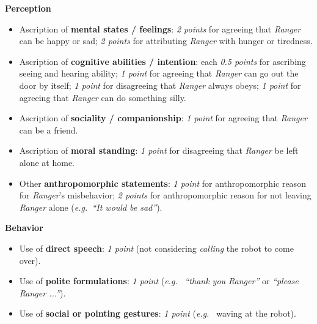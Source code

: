 \documentclass[letterpaper, 10pt, conference]{ieeeconf}
\newcommand{\eg}{{\textit{e.g.~}}}
\begin{document}
\vspace{0.5em}
\textbf{Perception}

\begin{itemize}
    \item Ascription of \textbf{mental states / feelings}: \textit{2 points} for agreeing
            that \emph{Ranger} can be happy or sad; \textit{2 points} for attributing \emph{Ranger} with
        hunger or tiredness.

    \item Ascription of \textbf{cognitive abilities / intention}: each \textit{0.5
        points} for ascribing seeing and hearing ability; \textit{1 point} for agreeing
            that \emph{Ranger} can go out the door by itself; \textit{1 point} for disagreeing that
            \emph{Ranger} always obeys; \textit{1 point} for agreeing that \emph{Ranger} can do something
        silly.

    \item Ascription of \textbf{sociality / companionship}: \textit{1 point} for agreeing
        that \emph{Ranger} can be a friend.

    \item Ascription of \textbf{moral standing}: \textit{1 point} for disagreeing that
        \emph{Ranger} be left alone at home.

    \item Other \textbf{anthropomorphic statements}: \textit{1 point} for anthropomorphic
        reason for \emph{Ranger}'s misbehavior; \textit{2 points} for anthropomorphic reason
        for not leaving \emph{Ranger} alone (\eg \textit{``It would be sad''}).

\end{itemize}

\textbf{Behavior}

\begin{itemize}
    \item Use of \textbf{direct speech}: \textit{1 point} (not considering
        \textit{calling} the robot to come over).

    \item Use of \textbf{polite formulations}: \textit{1 point} (\eg
        \textit{``thank you \emph{Ranger}''} or \textit{``please \emph{Ranger} ...''}).

    \item Use of \textbf{social or pointing gestures}: \textit{1 point} (\eg
        waving at the robot).

\end{itemize}
\end{document}
